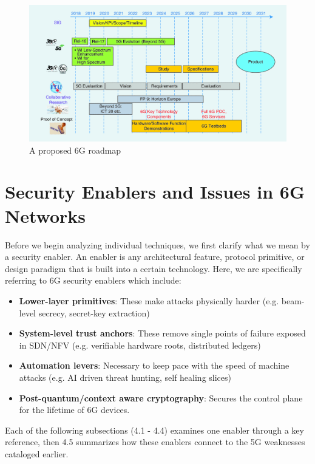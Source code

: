 \documentclass[acmtog]{acmart}
\begin{document}
\begin{figure}[h]
  \centering
  \includegraphics[width=\linewidth]{6G_roadmap.png}
  \caption{A proposed 6G roadmap \cite{ref4}}
  \label{fig:6g_roadmap}
\end{figure}

\section{Security Enablers and Issues in 6G Networks}

Before we begin analyzing individual techniques, we first clarify what we mean by a security enabler. An enabler is any architectural feature, protocol primitive, or design paradigm that is built into a certain technology. Here, we are specifically referring to 6G security enablers which include:
\begin{itemize}
  \item \textbf{Lower-layer primitives}: These make attacks physically harder (e.g. beam-level secrecy, secret-key extraction)
  \item \textbf{System-level trust anchors}: These remove single points of failure exposed in SDN/NFV (e.g. verifiable hardware roots, distributed ledgers)
  \item \textbf{Automation levers}: Necessary to keep pace with the speed of machine attacks (e.g. AI driven threat hunting, self healing slices)
  \item \textbf{Post-quantum/context aware cryptography}: Secures the control plane for the lifetime of 6G devices.
\end{itemize}

Each of the following subsections (4.1 - 4.4) examines one enabler through a key reference, then 4.5 summarizes how these enablers connect to the 5G weaknesses cataloged earlier.
\end{document}
